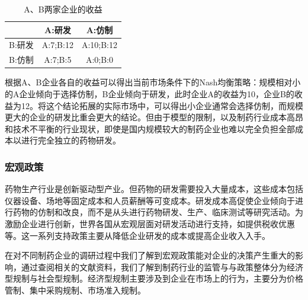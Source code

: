 \documentclass{apa6}
\begin{document}
			
			\begin{table}
				\centering
				\begin{tabular}{|c|c|c|}
					\hline
					\quad  & A:研发   & A:仿制    \\
					\hline
					B:研发 & A:7;B:12 & A:10;B:12 \\
					\hline
					B:仿制 & A:7;B:5  & A:0;B:0   \\
					\hline
				\end{tabular}
				\caption{A、B两家企业的收益}
				\label{tab:tab2}
			\end{table}
			
			根据A、B企业各自的收益可以得出当前市场条件下的Nash均衡策略：规模相对小的A企业倾向于选择仿制，B企业倾向于研发，此时企业A的收益为10，企业B的收益为12。将这个结论拓展的实际市场中，可以得出小企业通常会选择仿制，而规模更大的企业的研发比重会更大的结论。但由于模型的限制，以及制药行业成本高昂和技术不平衡的行业现状，即使是国内规模较大的制药企业也难以完全负担全部成本以进行完全独立的药物研发。
			
			\subsubsection{宏观政策}
			
			药物生产行业是创新驱动型产业。但药物的研发需要投入大量成本，这些成本包括仪器设备、场地等固定成本和人员薪酬等可变成本。研发成本高促使企业倾向于进行药物的仿制和改良，而不是从头进行药物研发、生产、临床测试等研究活动。为激励企业进行创新，世界各国从宏观层面对研发活动进行支持，如提供税收优惠等。这一系列支持政策主要从降低企业研发的成本或提高企业收入入手。
			
			在对不同制药企业的调研过程中我们了解到宏观政策能对企业的决策产生重大的影响，通过查阅相关的文献资料，我们了解到制药行业的监管与与政策整体分为经济型规制与社会型规制\citep{RN26}。经济型规制主要涉及到企业在市场上的行为，主要分为价格管制、集中采购规制、市场准入规制。
			
\end{document}
